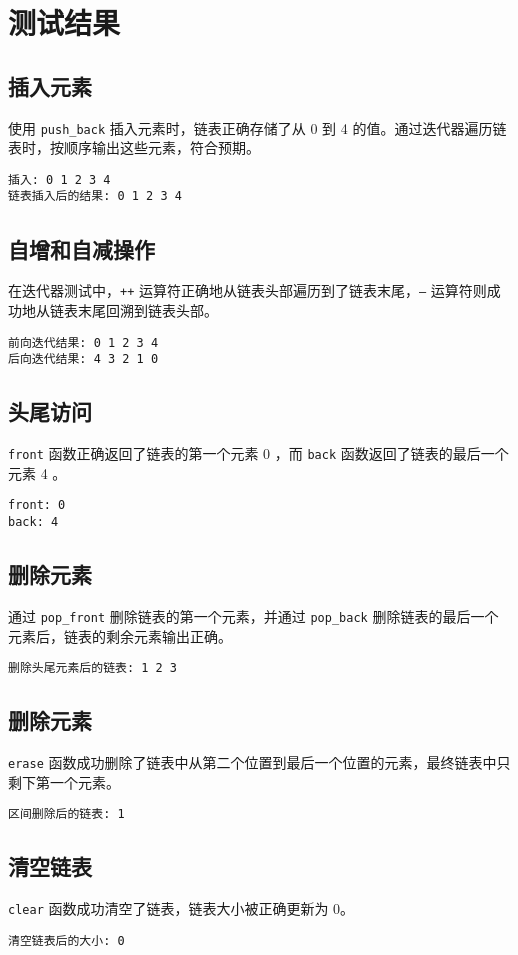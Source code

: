 \documentclass[UTF8]{ctexart}
\begin{document}
\section{测试结果}
\subsection{插入元素}
使用 \texttt{push\_back} 插入元素时，链表正确存储了从 0 到 4 的值。通过迭代器遍历链表时，按顺序输出这些元素，符合预期。

\begin{verbatim}
插入: 0 1 2 3 4
链表插入后的结果: 0 1 2 3 4
\end{verbatim}

\subsection{自增和自减操作}
在迭代器测试中，\texttt{++} 运算符正确地从链表头部遍历到了链表末尾，\texttt{--} 运算符则成功地从链表末尾回溯到链表头部。

\begin{verbatim}
前向迭代结果: 0 1 2 3 4
后向迭代结果: 4 3 2 1 0
\end{verbatim}

\subsection{头尾访问}
\texttt{front} 函数正确返回了链表的第一个元素 0 ，而 \texttt{back} 函数返回了链表的最后一个元素 4 。

\begin{verbatim}
front: 0
back: 4
\end{verbatim}

\subsection{删除元素}
通过 \texttt{pop\_front} 删除链表的第一个元素，并通过 \texttt{pop\_back} 删除链表的最后一个元素后，链表的剩余元素输出正确。

\begin{verbatim}
删除头尾元素后的链表: 1 2 3
\end{verbatim}

\subsection{删除元素}
\texttt{erase} 函数成功删除了链表中从第二个位置到最后一个位置的元素，最终链表中只剩下第一个元素。

\begin{verbatim}
区间删除后的链表: 1
\end{verbatim}

\subsection{清空链表}
\texttt{clear} 函数成功清空了链表，链表大小被正确更新为 0。

\begin{verbatim}
清空链表后的大小: 0
\end{verbatim}
\end{document}
